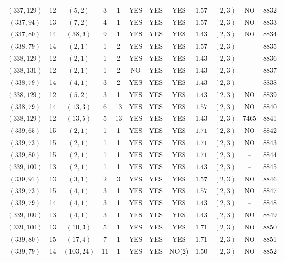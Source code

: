 \begin{longtable}{|c|c|c|c|c|c|c|c|c|c|c|c|}
$(337,129)$ & 12 & $(5,2)$ & 3 & 1 & YES & YES & YES & $1.57$ & $(2,3)$ & NO & 8832\\
$(337,94)$ & 13 & $(7,2)$ & 4 & 1 & YES & YES & YES & $1.57$ & $(2,3)$ & NO & 8833\\
$(337,80)$ & 14 & $(38,9)$ & 9 & 1 & YES & YES & YES & $1.43$ & $(2,3)$ & NO & 8834\\
$(338,79)$ & 14 & $(2,1)$ & 1 & 2 & YES & YES & YES & $1.57$ & $(2,3)$ & -- & 8835\\
$(338,129)$ & 12 & $(2,1)$ & 1 & 2 & YES & YES & YES & $1.43$ & $(2,3)$ & -- & 8836\\
$(338,131)$ & 12 & $(2,1)$ & 1 & 2 & NO & YES & YES & $1.43$ & $(2,3)$ & -- & 8837\\
$(338,79)$ & 14 & $(4,1)$ & 3 & 2 & YES & YES & YES & $1.43$ & $(2,3)$ & -- & 8838\\
$(338,129)$ & 12 & $(5,2)$ & 3 & 1 & YES & YES & YES & $1.43$ & $(2,3)$ & NO & 8839\\
$(338,79)$ & 14 & $(13,3)$ & 6 & 13 & YES & YES & YES & $1.57$ & $(2,3)$ & NO & 8840\\
$(338,129)$ & 12 & $(13,5)$ & 5 & 13 & YES & YES & YES & $1.43$ & $(2,3)$ & 7465 & 8841\\
$(339,65)$ & 15 & $(2,1)$ & 1 & 1 & YES & YES & YES & $1.71$ & $(2,3)$ & NO & 8842\\
$(339,73)$ & 15 & $(2,1)$ & 1 & 1 & YES & YES & YES & $1.71$ & $(2,3)$ & NO & 8843\\
$(339,80)$ & 15 & $(2,1)$ & 1 & 1 & YES & YES & YES & $1.71$ & $(2,3)$ & -- & 8844\\
$(339,100)$ & 13 & $(2,1)$ & 1 & 1 & YES & YES & YES & $1.43$ & $(2,3)$ & -- & 8845\\
$(339,91)$ & 13 & $(3,1)$ & 2 & 3 & YES & YES & YES & $1.57$ & $(2,3)$ & NO & 8846\\
$(339,73)$ & 15 & $(4,1)$ & 3 & 1 & YES & YES & YES & $1.57$ & $(2,3)$ & NO & 8847\\
$(339,79)$ & 14 & $(4,1)$ & 3 & 1 & YES & YES & YES & $1.43$ & $(2,3)$ & -- & 8848\\
$(339,100)$ & 13 & $(4,1)$ & 3 & 1 & YES & YES & YES & $1.43$ & $(2,3)$ & NO & 8849\\
$(339,100)$ & 13 & $(10,3)$ & 5 & 1 & YES & YES & YES & $1.71$ & $(2,3)$ & NO & 8850\\
$(339,80)$ & 15 & $(17,4)$ & 7 & 1 & YES & YES & YES & $1.71$ & $(2,3)$ & NO & 8851\\
$(339,79)$ & 14 & $(103,24)$ & 11 & 1 & YES & YES & NO(2) & $1.50$ & $(2,3)$ & NO & 8852\\

\end{longtable}
